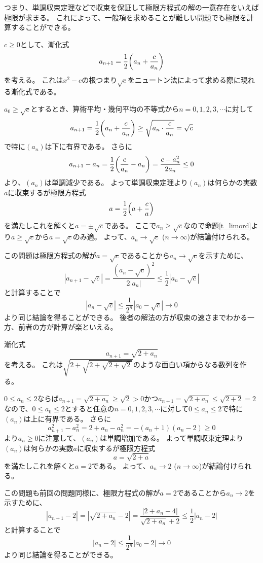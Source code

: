 つまり、単調収束定理などで収束を保証して極限方程式の解の一意存在をいえば極限が求まる。
これによって、一般項を求めることが難しい問題でも極限を計算することができる。

\begin{example}
$c \ge 0$として、漸化式
$$
a_{n+1} = \frac{1}{2}\lrparen*{a_n+\frac{c}{a_n}}
$$
を考える。
これは$x^2-c$の根つまり$\sqrt{c}$をニュートン法によって求める際に現れる漸化式である。

$a_0 \ge \sqrt{c}$とするとき、算術平均・幾何平均の不等式から$n = 0, 1, 2, 3, \cdots$に対して
$$
a_{n+1} = \frac{1}{2}\lrparen*{a_n+\frac{c}{a_n}} \ge \sqrt{a_n\cdot\frac{c}{a_n}} = \sqrt{c}
$$
で特に$(a_n)$は下に有界である。
さらに
$$
a_{n+1}-a_n = \frac{1}{2}\lrparen*{\frac{c}{a_n}-a_n} = \frac{c-a_n^2}{2 a_n} \le 0
$$
より、$(a_n)$は単調減少である。
よって単調収束定理より$(a_n)$は何らかの実数$a$に収束するが極限方程式
$$
a = \frac{1}{2}\lrparen*{a+\frac{c}{a}}
$$
を満たしこれを解くと$a = \pm\sqrt{c}$である。
ここで$a_n \ge \sqrt{c}$なので命題\ref{t_limord}より$a \ge \sqrt{c}$から$a = \sqrt{c}$のみ適。
よって、$a_n \to \sqrt{c}$ ($n \to \infty$)が結論付けられる。

この問題は極限方程式の解が$a = \sqrt{c}$であることから$a_n \to \sqrt{c}$を示すために、
$$
|a_{n+1}-\sqrt{c}| = \frac{(a_n-\sqrt{c})^2}{2|a_n|} \le \frac{1}{2}|a_n-\sqrt{c}|
$$
と計算することで
$$
|a_n-\sqrt{c}| \le \frac{1}{2^n}|a_0-\sqrt{c}| \to 0
$$
より同じ結論を得ることができる。
後者の解法の方が収束の速さまでわかる一方、前者の方が計算が楽といえる。
\end{example}

\begin{example}
漸化式
$$
a_{n+1} = \sqrt{2+a_n}
$$
を考える。
これは$\sqrt{2+\sqrt{2+\sqrt{2+\sqrt{2}}}}$のような面白い項からなる数列を作る。

$0 \le a_n \le 2$ならば$a_{n+1} = \sqrt{2+a_n} \ge \sqrt{2} > 0$かつ$a_{n+1} = \sqrt{2+a_n} \le \sqrt{2+2} = 2$なので、$0 \le a_0 \le 2$とすると任意の$n = 0, 1, 2, 3, \cdots$に対して$0 \le a_n \le 2$で特に$(a_n)$は上に有界である。
さらに
$$
a_{n+1}^2-a_n^2 = 2+a_n-a_n^2 = -(a_n+1)(a_n-2) \ge 0
$$
より$a_n \ge 0$に注意して、$(a_n)$は単調増加である。
よって単調収束定理より$(a_n)$は何らかの実数$a$に収束するが極限方程式
$$
a = \sqrt{2+a}
$$
を満たしこれを解くと$a = 2$である。
よって、$a_n \to 2$ ($n \to \infty$)が結論付けられる。

この問題も前回の問題同様に、極限方程式の解が$a = 2$であることから$a_n \to 2$を示すために、
$$
|a_{n+1}-2| = |\sqrt{2+a_n}-2| = \frac{|2+a_n-4|}{\sqrt{2+a_n}+2} \le \frac{1}{2}|a_n-2|
$$
と計算することで
$$
|a_n-2| \le \frac{1}{2^n}|a_0-2| \to 0
$$
より同じ結論を得ることができる。
\end{example}

